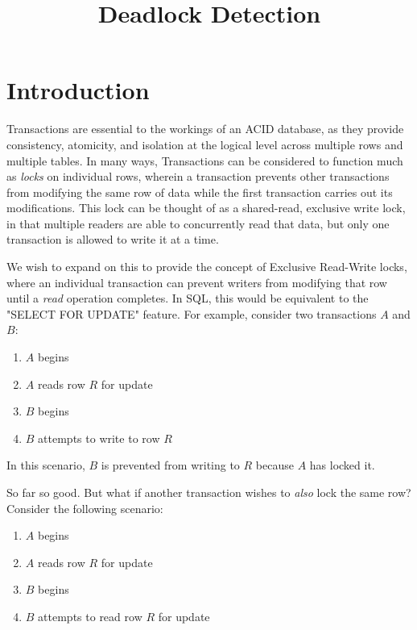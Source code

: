 \documentclass[11pt]{article}
\begin{document}
\title{Deadlock Detection}

\maketitle

\section{Introduction}
Transactions are essential to the workings of an ACID database, as they provide consistency, atomicity, and isolation at the logical level across multiple rows and multiple tables. In many ways, Transactions can be considered to function much as \emph{locks} on individual rows, wherein a transaction prevents other transactions from modifying the same row of data while the first transaction carries out its modifications. This lock can be thought of as a shared-read, exclusive write lock, in that multiple readers are able to concurrently read that data, but only one transaction is allowed to write it at a time.

We wish to expand on this to provide the concept of Exclusive Read-Write locks, where an individual transaction can prevent writers from modifying that row until a \emph{read} operation completes. In SQL, this would be equivalent to the "SELECT FOR UPDATE" feature. For example, consider two transactions $A$ and $B$:

\begin{enumerate}
				\item $A$ begins
				\item $A$ reads row $R$ for update
				\item $B$ begins
				\item $B$ attempts to write to row $R$
\end{enumerate}

In this scenario, $B$ is prevented from writing to $R$ because $A$ has locked it.

So far so good. But what if another transaction wishes to \emph{also} lock the same row? Consider the following scenario:

\begin{enumerate}
				\item $A$ begins
				\item $A$ reads row $R$ for update
				\item $B$ begins
				\item $B$ attempts to read row $R$ for update
\end{enumerate}
\end{document}
